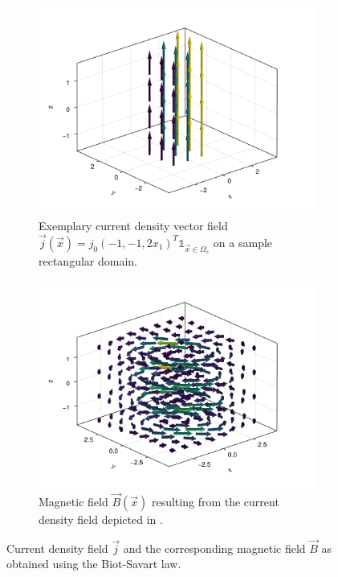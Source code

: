 \documentclass[10pt]{article}
\begin{document}
  \begin{figure}[H]
    \centering
    \begin{subfigure}[t]{0.48\textwidth}
      \centering
      \includegraphics[width=\textwidth]{../figures/homo-cdp-j-field.pdf}
      \caption{Exemplary current density vector field $\vec{j}(\vec{x}) = {j}_0 (-1, -1, 2 x_1)^T \mathds{1}_{\vec{x} \in \Omega_s}$ on a sample rectangular domain.}
      \label{fig:demo-cdp-j-field}
    \end{subfigure}
    \hfill
    \begin{subfigure}[t]{0.48\textwidth}
      \centering
      \includegraphics[width=\textwidth]{../figures/homo-cdp-b-field.pdf}
      \caption{Magnetic field $\vec{B}(\vec{x})$ resulting from the current density field depicted in .}
      \label{fig:demo-cdp-b-field}
    \end{subfigure}
    \caption{Current density field $\vec{j}$ and the corresponding magnetic field $\vec{B}$ as obtained using the Biot-Savart law.}
  \end{figure}
\end{document}
